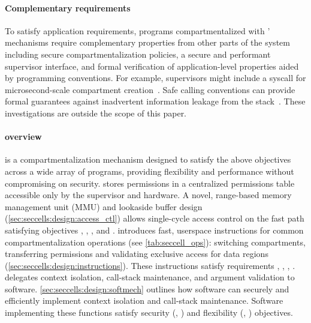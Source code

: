 \paragraph{Complementary requirements}
To satisfy application requirements,
programs compartmentalized with \seccells' mechanisms require
complementary properties from other parts of the system
including secure compartmentalization policies, 
a secure and performant supervisor interface, 
and formal verification of application-level properties
aided by programming conventions.
For example, supervisors might include a syscall for 
microsecond-scale compartment creation~\cite{LittonVE0BD16}.
Safe calling conventions can provide formal guarantees against
inadvertent information leakage from the stack~\cite{SkorstengaardDB20}.
These investigations are outside the scope of this paper.

\paragraph{\seccells overview}
\seccells is a compartmentalization mechanism designed
to satisfy the above objectives across a wide array of 
programs, providing flexibility and performance without compromising on 
security.
\seccells stores permissions in a centralized permissions table accessible 
only by the supervisor and hardware.
A novel, range-based memory management unit (MMU) and 
lookaside buffer design (\autoref{sec:seccells:design:access_ctl})
allows single-cycle access control on the fast path satisfying 
objectives , , , and .
\seccells introduces fast, userspace instructions for common 
compartmentalization operations (see \autoref{tab:seccell_ops}): 
switching compartments, transferring permissions and validating
exclusive access for data regions (\autoref{sec:seccells:design:instructions}).
These instructions satisfy requirements , ,
, .
\seccells delegates context isolation, call-stack maintenance,
and argument validation to software.
\autoref{sec:seccells:design:softmech} outlines how software can
securely and efficiently implement context isolation and call-stack 
maintenance.
Software implementing these functions satisfy security (, )
and flexibility (, ) objectives.

\section{\seccells}
\label{sec:seccells:design}


